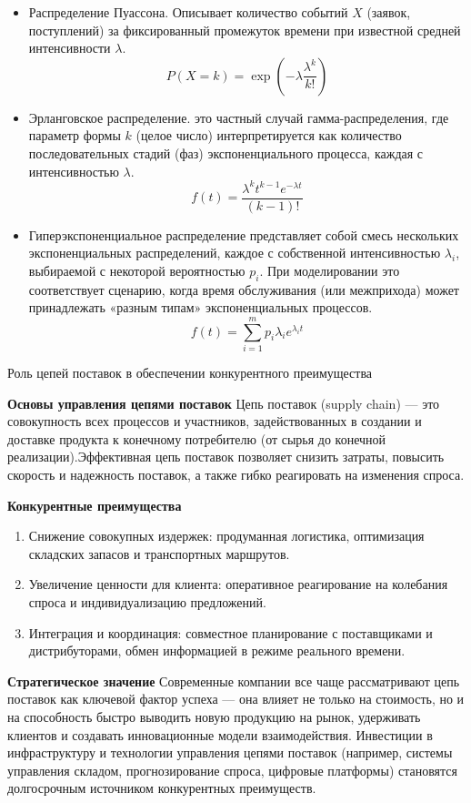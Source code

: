 \begin{itemize}
    \item Распределение Пуассона. Описывает количество событий $X$ (заявок, поступлений) за фиксированный промежуток времени при известной средней интенсивности $\lambda$. $$P(X=k) = \exp \left(-\lambda \frac{\lambda ^ k}{k!} \right)$$
    \item Эрланговское распределение. это частный случай гамма-распределения, где параметр формы $k$ (целое число) интерпретируется как количество последовательных стадий (фаз) экспоненциального процесса, каждая с интенсивностью $\lambda$. $$f(t) = \frac{\lambda^k t ^{k-1} e^{-\lambda t}}{(k-1)!}$$
    \item Гиперэкспоненциальное распределение представляет собой смесь нескольких экспоненциальных распределений, каждое с собственной интенсивностью $\lambda_i$, выбираемой с некоторой вероятностью $p_i$. При моделировании это соответствует сценарию, когда время обслуживания (или межприхода) может принадлежать «разным типам» экспоненциальных процессов. $$f(t) = \sum \limits ^m _{i=1} p_i \lambda _i e^{\lambda_i t}$$    
\end{itemize}

Роль цепей поставок в обеспечении конкурентного преимущества

\textbf{Основы управления цепями поставок}
Цепь поставок (supply chain) --- это совокупность всех процессов и участников, задействованных в создании и доставке продукта к конечному потребителю (от сырья до конечной реализации).Эффективная цепь поставок позволяет снизить затраты, повысить скорость и надежность поставок, а также гибко реагировать на изменения спроса.

\textbf{Конкурентные преимущества}
\begin{enumerate}
    \item Снижение совокупных издержек: продуманная логистика, оптимизация складских запасов и транспортных маршрутов.
    \item Увеличение ценности для клиента: оперативное реагирование на колебания спроса и индивидуализацию предложений.
    \item Интеграция и координация: совместное планирование с поставщиками и дистрибуторами, обмен информацией в режиме реального времени.
\end{enumerate}

\textbf{Стратегическое значение}
Современные компании все чаще рассматривают цепь поставок как ключевой фактор успеха --- она влияет не только на стоимость, но и на способность быстро выводить новую продукцию на рынок, удерживать клиентов и создавать инновационные модели взаимодействия. Инвестиции в инфраструктуру и технологии управления цепями поставок (например, системы управления складом, прогнозирование спроса, цифровые платформы) становятся долгосрочным источником конкурентных преимуществ.

